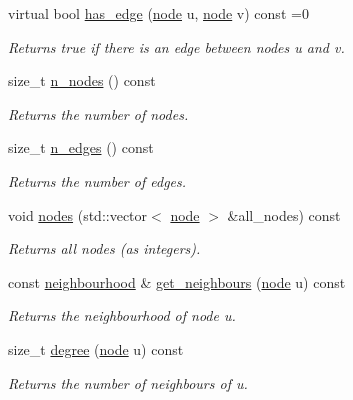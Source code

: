 \begin{DoxyCompactItemize}
virtual bool \hyperlink{classlgraph_1_1xxgraph_a4e36e9722df020df6ba1dc47b7d9d830}{has\+\_\+edge} (\hyperlink{namespacelgraph_a397169dd66adf725210a30fb7251773e}{node} u, \hyperlink{namespacelgraph_a397169dd66adf725210a30fb7251773e}{node} v) const =0
\begin{DoxyCompactList}\small\item\em Returns true if there is an edge between nodes {\itshape u} and {\itshape v}. \end{DoxyCompactList}\item 
size\+\_\+t \hyperlink{classlgraph_1_1xxgraph_a67f651617ada4053b569102b9a54cab0}{n\+\_\+nodes} () const
\begin{DoxyCompactList}\small\item\em Returns the number of nodes. \end{DoxyCompactList}\item 
size\+\_\+t \hyperlink{classlgraph_1_1xxgraph_af00bce8b07a42754601d1e3bebe2c1fa}{n\+\_\+edges} () const
\begin{DoxyCompactList}\small\item\em Returns the number of edges. \end{DoxyCompactList}\item 
\mbox{\label{classlgraph_1_1xxgraph_a9a24f0e1c0c40abc505e35d0dd9bf10a}} 
void \hyperlink{classlgraph_1_1xxgraph_a9a24f0e1c0c40abc505e35d0dd9bf10a}{nodes} (std\+::vector$<$ \hyperlink{namespacelgraph_a397169dd66adf725210a30fb7251773e}{node} $>$ \&all\+\_\+nodes) const
\begin{DoxyCompactList}\small\item\em Returns all nodes (as integers). \end{DoxyCompactList}\item 
const \hyperlink{namespacelgraph_a052e7766c13f3a43cec0aec8173fdede}{neighbourhood} \& \hyperlink{classlgraph_1_1xxgraph_a745a535506115c66ce0993ef7e7759ba}{get\+\_\+neighbours} (\hyperlink{namespacelgraph_a397169dd66adf725210a30fb7251773e}{node} u) const
\begin{DoxyCompactList}\small\item\em Returns the neighbourhood of node u. \end{DoxyCompactList}\item 
size\+\_\+t \hyperlink{classlgraph_1_1xxgraph_a20ebc2927ee8fb8bb0a2c3b448d9ed78}{degree} (\hyperlink{namespacelgraph_a397169dd66adf725210a30fb7251773e}{node} u) const
\begin{DoxyCompactList}\small\item\em Returns the number of neighbours of u. \end{DoxyCompactList}\item 

\end{DoxyCompactItemize}
